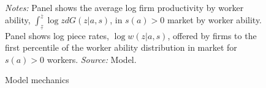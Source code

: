 \begin{figure}[!htb]
  \centering
  \caption{Model mechanics \label{figure: model mechanics}}
  \prefigvspace
  \hspace{.4in} %
  \\
  \postfigvspace
  \begin{minipage}[t]{1\columnwidth}%
    \begin{spacing}{0.75}
      \emph{\scriptsize{}Notes: }{\scriptsize{}Panel  shows the average log firm productivity by worker ability, $\int_{\underline{z}}^{\overline{z}} \log z dG(z|a,s)$, in $s(a)>0$ market by worker ability. Panel  shows log piece rates, $\log w(z|a,s)$, offered by firms to the first percentile of the worker ability distribution in market for $s(a)>0$ workers. %
      \emph{\scriptsize{}Source: }\scriptsize{}Model.}
    \end{spacing}
  \end{minipage}
\end{figure}
